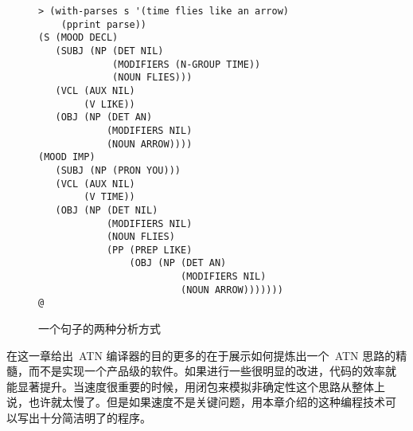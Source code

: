 \begin{figure}
\begin{lstlisting}
> (with-parses s '(time flies like an arrow)
    (pprint parse))
(S (MOOD DECL)
   (SUBJ (NP (DET NIL)
             (MODIFIERS (N-GROUP TIME))
             (NOUN FLIES)))
   (VCL (AUX NIL)
        (V LIKE))
   (OBJ (NP (DET AN)
            (MODIFIERS NIL)
            (NOUN ARROW))))
(MOOD IMP)
   (SUBJ (NP (PRON YOU)))
   (VCL (AUX NIL)
        (V TIME))
   (OBJ (NP (DET NIL)
            (MODIFIERS NIL)
            (NOUN FLIES)
            (PP (PREP LIKE)
                (OBJ (NP (DET AN)
                         (MODIFIERS NIL)
                         (NOUN ARROW)))))))
@
\end{lstlisting}
  \caption{一个句子的两种分析方式}
  \label{fig:two_parsings_for_a_sentence}
\end{figure}

在这一章给出~\textsc{ATN} 编译器的目的更多的在于展示如何提炼出一个~\textsc{ATN} 思路的精
髓，而不是实现一个产品级的软件。如果进行一些很明显的改进，代码的效率就
能显著提升。当速度很重要的时候，用闭包来模拟非确定性这个思路从整体上
说，也许就太慢了。但是如果速度不是关键问题，用本章介绍的这种编程技术可
以写出十分简洁明了的程序。


